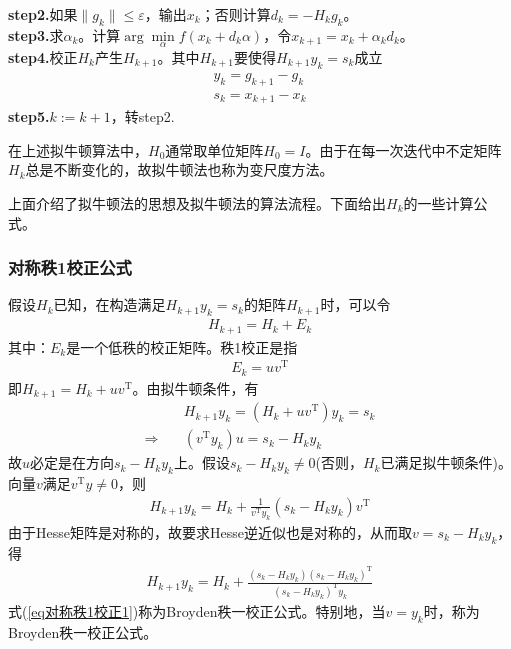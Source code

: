         \textbf{step2.}如果$\|g_k\| \leqslant \varepsilon$，输出$x_k$；否则计算$d_k=-H_kg_k$。\\
        \textbf{step3.}求$\alpha_k$。计算$\arg \mathop {\min}\limits_{\alpha}f(x_k+d_k \alpha)$，令$x_{k+1}=x_k+{\alpha}_kd_k$。\\
        \textbf{step4.}校正$H_k$产生$H_{k+1}$。其中$H_{k+1}$要使得$H_{k+1}y_k=s_k$成立
        \begin{align*}
         y_k =g_{k+1} - g_k\\
         s_k =x_{k+1} - x_k
        \end{align*}
        \textbf{step5.}$k:=k+1$，转step2.
        \par
        在上述拟牛顿算法中，$H_0$通常取单位矩阵$H_0=I$。由于在每一次迭代中不定矩阵$H_k$总是不断变化的，故拟牛顿法也称为变尺度方法。

        上面介绍了拟牛顿法的思想及拟牛顿法的算法流程。下面给出$H_k$的一些计算公式。
        \subsubsection{对称秩1校正公式}
            \par
            假设$H_k$已知，在构造满足$H_{k+1}y_k=s_k$的矩阵$H_{k+1}$时，可以令
            \begin{align*}
            H_{k+1} =H_{k} +E_k
            \end{align*}
            其中：$E_k$是一个低秩的校正矩阵。秩1校正是指
            \begin{align*}
            E_{k} = uv^\mathrm{T}
            \end{align*}
            即$H_{k+1}=H_k+uv^\mathrm{T} $。由拟牛顿条件，有
            \begin{align*}
            &H_{k+1}y_k=(H_k+uv^\mathrm{T} )y_k=s_k\\
            \Rightarrow \quad &(v^\mathrm{T} y_k)u=s_k-H_ky_k
            \end{align*}
            故$u$必定是在方向$s_k-H_ky_k$上。假设$s_k-H_ky_k \neq 0$(否则，$H_k$已满足拟牛顿条件)。向量$v$满足$v^\mathrm{T} y \neq 0$，则
            \begin{align}
            \label{eq对称秩1校正1}
            H_{k+1}y_k=H_k+\frac {1}{{v}^\mathrm{T} y_k}(s_k-H_ky_k)v^\mathrm{T}
            \end{align}
            由于Hesse矩阵是对称的，故要求Hesse逆近似也是对称的，从而取$v=s_k-H_ky_k$，得
            \begin{align}
            \label{eq对称秩1校正2}
            H_{k+1}y_k=H_k+\frac {(s_k-H_ky_k)(s_k-H_ky_k)^\mathrm{T} }{(s_k-H_ky_k)^\mathrm{T} y_k}
            \end{align}
            式(\ref{eq对称秩1校正1})称为Broyden秩一校正公式。特别地，当$v=y_k$时，称为Broyden秩一校正公式。
